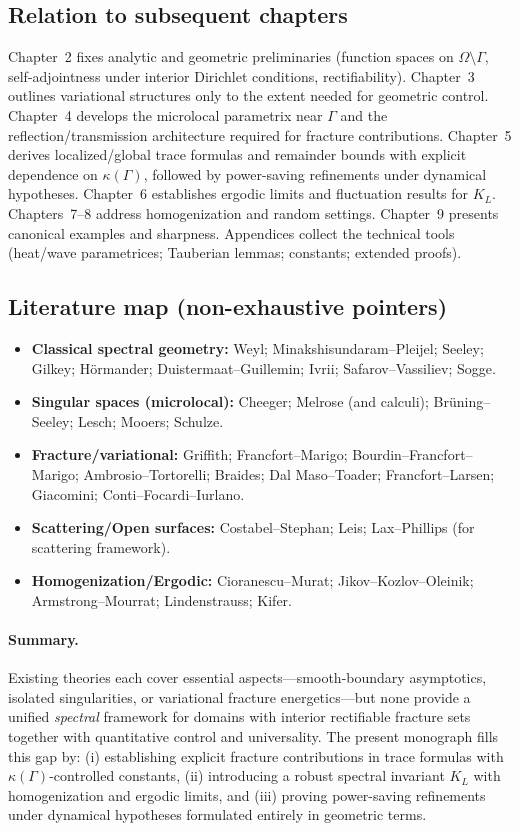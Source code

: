 \subsection*{Relation to subsequent chapters}
Chapter~2 fixes analytic and geometric preliminaries (function spaces on
$\Omega\setminus\Gamma$, self-adjointness under interior Dirichlet conditions, rectifiability).
Chapter~3 outlines variational structures only to the extent needed for geometric control.
Chapter~4 develops the microlocal parametrix near $\Gamma$ and the reflection/transmission
architecture required for fracture contributions. Chapter~5 derives localized/global trace
formulas and remainder bounds with explicit dependence on $\kappa(\Gamma)$, followed by
power-saving refinements under dynamical hypotheses. Chapter~6 establishes ergodic limits
and fluctuation results for $K_L$. Chapters~7--8 address homogenization and random settings.
Chapter~9 presents canonical examples and sharpness. Appendices collect the technical tools
(heat/wave parametrices; Tauberian lemmas; constants; extended proofs).

\subsection*{Literature map (non-exhaustive pointers)}
\begin{itemize}
  \item \textbf{Classical spectral geometry:} Weyl; Minakshisundaram--Pleijel; Seeley; Gilkey;
  Hörmander; Duistermaat--Guillemin; Ivrii; Safarov--Vassiliev; Sogge.
  \item \textbf{Singular spaces (microlocal):} Cheeger; Melrose (and calculi); Brüning--Seeley; Lesch; Mooers; Schulze.
  \item \textbf{Fracture/variational:} Griffith; Francfort--Marigo; Bourdin--Francfort--Marigo; Ambrosio--Tortorelli; Braides; Dal Maso--Toader; Francfort--Larsen; Giacomini; Conti--Focardi--Iurlano.
  \item \textbf{Scattering/Open surfaces:} Costabel--Stephan; Leis; Lax--Phillips (for scattering framework).
  \item \textbf{Homogenization/Ergodic:} Cioranescu--Murat; Jikov--Kozlov--Oleinik; Armstrong--Mourrat; Lindenstrauss; Kifer.
\end{itemize}

\paragraph{Summary.}
Existing theories each cover essential aspects—smooth-boundary asymptotics,
isolated singularities, or variational fracture energetics—but none provide a unified
\emph{spectral} framework for domains with interior rectifiable fracture sets together
with quantitative control and universality. The present monograph fills this gap by:
(i) establishing explicit fracture contributions in trace formulas with
$\kappa(\Gamma)$-controlled constants, (ii) introducing a robust spectral invariant $K_L$
with homogenization and ergodic limits, and (iii) proving power-saving refinements under
dynamical hypotheses formulated entirely in geometric terms.

